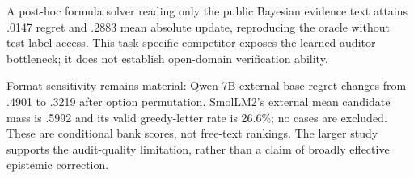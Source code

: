 A post-hoc formula solver reading only the public Bayesian evidence text
attains .0147 regret and .2883 mean absolute update, reproducing the oracle
without test-label access. This task-specific competitor exposes the learned
auditor bottleneck; it does not establish open-domain verification ability.

Format sensitivity remains material: Qwen-7B external base regret changes
from .4901 to .3219 after option permutation. SmolLM2's external mean
candidate mass is .5992 and its valid greedy-letter rate is 26.6\%; no cases
are excluded. These are conditional bank scores, not free-text rankings.
The larger study supports the audit-quality limitation, rather than a
claim of broadly effective epistemic correction.

